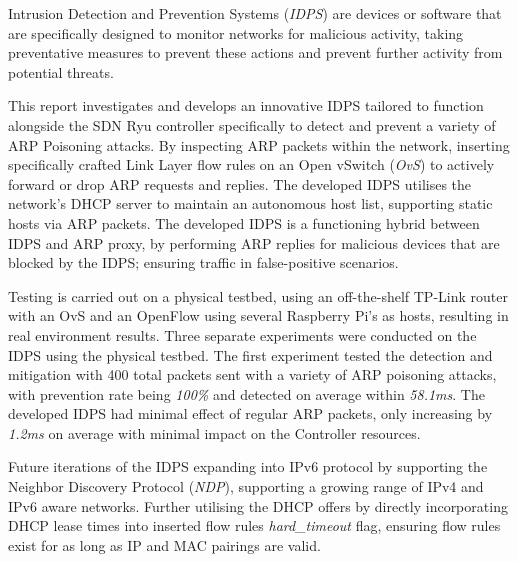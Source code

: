 \documentclass[12pt, oneside]{book}
\begin{document}
Intrusion Detection and Prevention Systems (\emph{IDPS}) are devices or software that are specifically designed
to monitor networks for malicious activity, taking preventative measures to prevent these actions and prevent
further activity from potential threats.

This report investigates and develops an innovative IDPS tailored to function alongside the SDN Ryu controller
specifically to detect and prevent a variety of ARP Poisoning attacks. By inspecting ARP packets within the network,
inserting specifically crafted Link Layer flow rules on an
Open vSwitch (\emph{OvS}) to actively forward or drop ARP requests and replies. The developed IDPS
utilises the network's DHCP server to maintain an autonomous host list, supporting static hosts via ARP packets.
The developed IDPS is a functioning hybrid between IDPS and ARP proxy,
by performing ARP replies for malicious devices that are blocked by the IDPS; ensuring traffic in false-positive scenarios.

Testing is carried out on a physical testbed, using an off-the-shelf TP-Link router with an OvS and an OpenFlow using
 several Raspberry Pi's as hosts,
resulting in real environment results. Three separate experiments were conducted on the IDPS using the physical
testbed. The first experiment tested the detection and mitigation with 400 total packets sent with 
a variety of ARP poisoning attacks, with prevention rate being \emph{100\%} and detected on average
within \emph{58.1ms}. The developed IDPS had minimal effect of regular ARP packets, only increasing by \emph{1.2ms}
on average with minimal impact on the Controller resources.

Future iterations of the IDPS expanding into IPv6 protocol by supporting the Neighbor Discovery Protocol (\emph{NDP}), 
supporting a growing range of IPv4 and IPv6 aware networks. Further utilising the DHCP offers by directly 
incorporating DHCP lease times into inserted flow rules \emph{hard\_timeout} flag, ensuring flow rules exist
for as long as IP and MAC pairings are valid.





\newpage

\tableofcontents

\listoffigures

\listoftables

\lstlistoflistings
\end{document}
